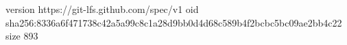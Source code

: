 version https://git-lfs.github.com/spec/v1
oid sha256:8336a6f471738c42a5a99c8c1a28d9bb0d4d68c589b4f2bcbc5bc09ae2bb4c22
size 893
